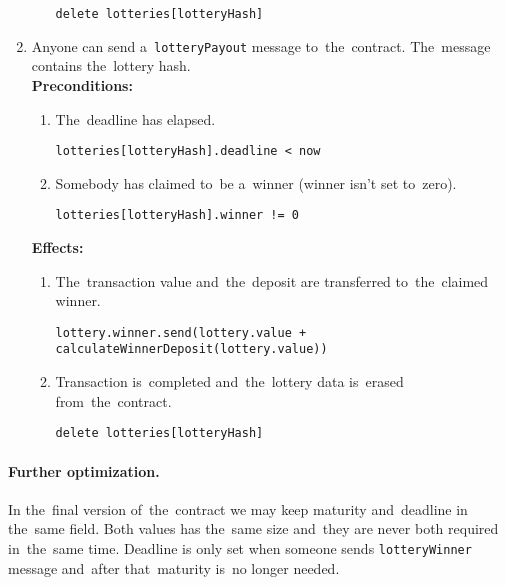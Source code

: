 \documentclass[a4paper]{article}
\begin{document}
\begin{enumerate}
\begin{enumerate}
\begin{center}
                        \texttt{delete lotteries[lotteryHash]}
                    \end{center}
            \end{enumerate}
        \item Anyone can send a~\texttt{lotteryPayout} message to~the~contract. The~message contains the~lottery hash.\\
            \textbf{Preconditions:}
            \begin{enumerate}
                \item The~deadline has elapsed.
                    \begin{center}
		                \texttt{lotteries[lotteryHash].deadline < now}
		            \end{center}
                \item Somebody has claimed to~be a~winner (winner isn't set to~zero).
                    \begin{center}
                        \texttt{lotteries[lotteryHash].winner != 0}
                    \end{center}
            \end{enumerate}
            \textbf{Effects:}
            \begin{enumerate}
                \item The~transaction value and~the~deposit are transferred to~the~claimed winner.
                    \begin{center}
			            \texttt{lottery.winner.send(lottery.value + calculateWinnerDeposit(lottery.value))}
			        \end{center}
                \item Transaction is~completed and~the~lottery data is~erased from~the~contract.
                    \begin{center}
                        \texttt{delete lotteries[lotteryHash]}
                    \end{center}
           \end{enumerate}
    \end{enumerate}

    \paragraph{Further optimization.} In the~final version of~the~contract we may keep maturity and~deadline in
        the~same field. Both values has the~same size and~they are never both required in~the~same time. Deadline is
        only set when someone sends \texttt{lotteryWinner} message and~after that~maturity is~no longer needed.
\end{document}
